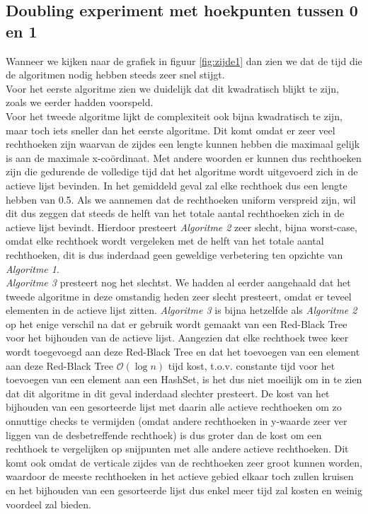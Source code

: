 \documentclass[11pt,a4paper,titlepage]{article}
\begin{document}
		\subsection{Doubling experiment met hoekpunten tussen 0 en 1}
			Wanneer we kijken naar de grafiek in figuur \ref{fig:zijde1} dan zien we dat de tijd die de algoritmen nodig hebben steeds zeer snel stijgt. \\
			Voor het eerste algoritme zien we duidelijk dat dit kwadratisch blijkt te zijn, zoals we eerder hadden voorspeld.\\
			Voor het tweede algoritme lijkt de complexiteit ook bijna kwadratisch te zijn, maar toch iets sneller dan het eerste algoritme. Dit komt omdat er zeer veel rechthoeken zijn waarvan de zijdes een lengte kunnen hebben die maximaal gelijk is aan de maximale x-coördinaat.  Met andere woorden er kunnen dus rechthoeken zijn die gedurende de volledige tijd dat het algoritme wordt uitgevoerd zich in de actieve lijst bevinden. In het gemiddeld geval zal elke rechthoek dus een lengte hebben van 0.5. Als we aannemen dat de rechthoeken uniform verspreid zijn, wil dit dus zeggen dat steeds de helft van het totale aantal rechthoeken zich in de actieve lijst bevindt. Hierdoor presteert \emph{Algoritme 2} zeer slecht, bijna worst-case, omdat elke rechthoek wordt vergeleken met de helft van het totale aantal rechthoeken, dit is dus inderdaad geen geweldige verbetering ten opzichte van \emph{Algoritme 1}.\\
			\emph{Algoritme 3} presteert nog het slechtst. We hadden al eerder aangehaald dat het tweede algoritme in deze omstandig heden zeer slecht presteert, omdat er teveel elementen in de actieve lijst zitten. \emph{Algoritme 3} is bijna hetzelfde als \emph{Algoritme 2} op het enige verschil na dat er gebruik wordt gemaakt van een Red-Black Tree voor het bijhouden van de actieve lijst.  Aangezien dat elke rechthoek twee keer wordt toegevoegd aan deze Red-Black Tree en dat het toevoegen van een element aan deze Red-Black Tree $\mathcal{O}(\log n)$ tijd kost, t.o.v. constante tijd voor het toevoegen van een element aan een HashSet, is het dus niet moeilijk om in te zien dat dit algoritme in dit geval inderdaad slechter presteert. De kost van het bijhouden van een gesorteerde lijst met daarin alle actieve rechthoeken om zo onnuttige checks te vermijden (omdat andere rechthoeken in y-waarde zeer ver liggen van de desbetreffende rechthoek) is dus groter dan de kost om een rechthoek te vergelijken op snijpunten met alle andere actieve rechthoeken. Dit komt ook omdat de verticale zijdes van de rechthoeken zeer groot kunnen worden, waardoor de meeste rechthoeken in het actieve gebied elkaar toch zullen kruisen en het bijhouden van een gesorteerde lijst dus enkel meer tijd zal kosten en weinig voordeel zal bieden.
\end{document}
